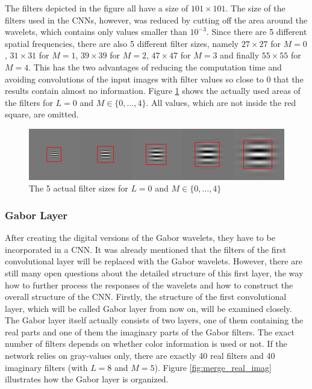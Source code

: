\documentclass[11pt, a4paper]{article}
\begin{document}
The filters depicted in the figure all have a size of $101 \times 101$. The size of the filters used in the \acp{CNN}, however, was reduced by cutting off the area around the wavelets, which contains only values smaller than $10^{-3}$. Since there are 5 different spatial frequencies, there are also 5 different filter sizes, namely $27 \times 27$ for $M = 0$, $31 \times 31$ for $M = 1$, $39 \times 39$ for $M = 2$, $47 \times 47$ for $M = 3$ and finally $55 \times 55$ for $M = 4$. This has the two advantages of reducing the computation time and avoiding convolutions of the input images with filter values so close to 0 that the results contain almost no information. Figure \ref{fig:gabor_filter_sizes} shows the actually used areas of the filters for $L=0$ and $M \in \{0,\ldots,4\}$. All values, which are not inside the red square, are omitted.
\begin{figure}[htbp]
	\centering
	\includegraphics[width=\textwidth]{gabor_filter_sizes.png}
	\caption{The 5 actual filter sizes for $L=0$ and $M \in \{0,\ldots,4\}$}
	\label{fig:gabor_filter_sizes}
\end{figure}

\subsubsection{Gabor Layer}
\label{subsubsec:gaborlayer}

After creating the digital versions of the Gabor wavelets, they have to be incorporated in a \ac{CNN}. It was already mentioned that the filters of the first convolutional layer will be replaced with the Gabor wavelets. However, there are still many open questions about the detailed structure of this first layer, the way how to further process the responses of the wavelets and how to construct the overall structure of the \ac{CNN}. Firstly, the structure of the first convolutional layer, which will be called Gabor layer from now on, will be examined closely. The Gabor layer itself actually consists of two layers, one of them containing the real parts and one of them the imaginary parts of the Gabor filters. The exact number of filters depends on whether color information is used or not. If the network relies on gray-values only, there are exactly 40 real filters and 40 imaginary filters (with $L = 8$ and $M = 5$). Figure \ref{fig:merge_real_imag} illustrates how the Gabor layer is organized.
\end{document}
